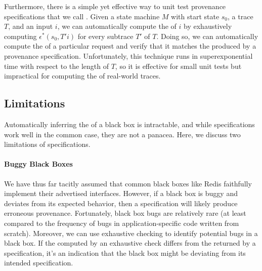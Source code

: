 Furthermore, there is a simple yet effective way to unit test provenance
specifications that we call .
Given a state machine $M$ with start state $s_0$, a trace $T$, and an input
$i$, we can automatically compute the \watprovenance{} of $i$ by exhaustively
computing $\epsilon^*(s_0, T'i)$ for every subtrace $T'$ of $T$.  Doing so, we
can automatically compute the \watprovenance{} of a particular request and
verify that it matches the \watprovenance{} produced by a provenance
specification.  Unfortunately, this technique runs in superexponential time
with respect to the length of $T$, so it is effective for small unit tests but
impractical for computing the \watprovenance{} of real-world traces. 

\subsection{Limitations}
Automatically inferring the \watprovenance{} of a black box is intractable, and
while \watprovenance{} specifications work well in the common case, they are
not a panacea. Here, we discuss two limitations of \watprovenance{}
specifications.

\paragraph{Buggy Black Boxes}
We have thus far tacitly assumed that common black boxes like Redis faithfully
implement their advertised interfaces. However, if a black box is buggy and
deviates from its expected behavior, then a \watprovenance{} specification will
likely produce erroneous provenance. Fortunately, black box bugs are relatively
rare (at least compared to the frequency of bugs in application-specific code
written from scratch). Moreover, we can use exhaustive \watprovenance{}
checking to identify potential bugs in a black box. 
If the \watprovenance{}
computed by an exhaustive \watprovenance{} check differs from the
\watprovenance{} returned by a specification, it's an indication that the black
box might be deviating from its intended specification.

